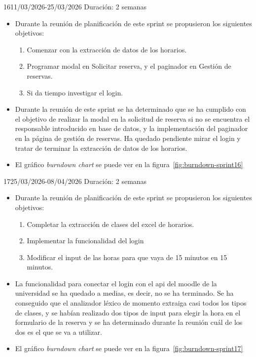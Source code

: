 \begin{Sprint}{16}{11/03/2026-25/03/2026}
	Duración: 2 semanas
	\begin{itemize}	
		\item{}
		Durante la reunión de planificación de este sprint se propusieron los siguientes objetivos:
		\begin{enumerate}
			\item Comenzar con la extracción de datos de los horarios.
			\item Programar modal en Solicitar reserva, y el paginador en Gestión de reservas.
			\item Si da tiempo investigar el login.
		\end{enumerate}
		\item{}
		Durante la reunión de este sprint se ha determinado que se ha cumplido con el objetivo de realizar la modal en la solicitud de reserva si no se encuentra el responsable introducido en base de datos, y la implementación del paginador en la página de gestión de reservas. Ha quedado pendiente mirar el login y tratar de terminar la extracción de datos de los horarios.
		
		\item{}
		El gráfico \textit{burndown chart} se puede ver en la figura~\ref{fig:burndown-sprint16}
	\end{itemize}
\end{Sprint}

\begin{Sprint}{17}{25/03/2026-08/04/2026}
	Duración: 2 semanas
	\begin{itemize}	
		\item{}
		Durante la reunión de planificación de este sprint se propusieron los siguientes objetivos:
		\begin{enumerate}
			\item Completar la extracción de clases del excel de horarios.
			\item Implementar la funcionalidad del login
			\item Modificar el input de las horas para que vaya de 15 minutos en 15 minutos.
		\end{enumerate}
		\item{}
		La funcionalidad para conectar el login con el api del moodle de la universidad se ha quedado a medias, es decir, no se ha terminado. Se ha conseguido que el analizador léxico de momento extraiga casi todos los tipos de clases, y se habían realizado dos tipos de input para elegir la hora en el formulario de la reserva y se ha determinado durante la reunión cuál de los dos es el que se va a utilizar.
		
		\item{}
		El gráfico \textit{burndown chart} se puede ver en la figura~\ref{fig:burndown-sprint17}
	\end{itemize}
\end{Sprint}

